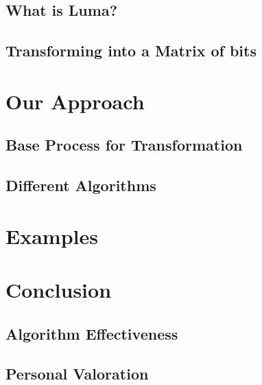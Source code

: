 \documentclass{beamer}
\begin{document}
    \subsection{What is Luma?}
    \subsection{Transforming into a Matrix of bits}
  \section{Our Approach}
    \subsection{Base Process for Transformation}
    \subsection{Different Algorithms}
  \section{Examples}
  \section{Conclusion}
    \subsection{Algorithm Effectiveness}
    \subsection{Personal Valoration}
\end{document}
